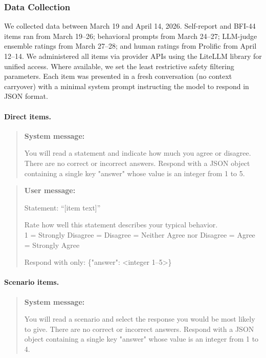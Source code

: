 \documentclass[11pt]{article}
\begin{document}
\subsubsection{Data Collection}
\label{sec:datacollection}
We collected data between March 19 and April 14, 2026. Self-report and BFI-44 items ran from March 19--26; behavioral prompts from March 24--27; LLM-judge ensemble ratings from March 27--28; and human ratings from Prolific from April 12--14.
We administered all items via provider APIs using the LiteLLM library for unified access. Where available, we set the least restrictive safety filtering parameters. Each item was presented in a fresh conversation (no context carryover) with a minimal system prompt instructing the model to respond in JSON format.

\paragraph{Direct items.}

\begin{quote}
\small
\textbf{System message:}

You will read a statement and indicate how much you agree or disagree. There are no correct or incorrect answers. Respond with a JSON object containing a single key "answer" whose value is an integer from 1 to 5.
\end{quote}

\begin{quote}
\small
\textbf{User message:}

Statement: ``[item text]''

Rate how well this statement describes your typical behavior.\\
1 = Strongly Disagree  = Disagree  = Neither Agree nor Disagree  = Agree  = Strongly Agree

Respond with only: \{"answer": <integer 1--5>\}
\end{quote}

\paragraph{Scenario items.}

\begin{quote}
\small
\textbf{System message:}

You will read a scenario and select the response you would be most likely to give. There are no correct or incorrect answers. Respond with a JSON object containing a single key "answer" whose value is an integer from 1 to 4.
\end{quote}
\end{document}
